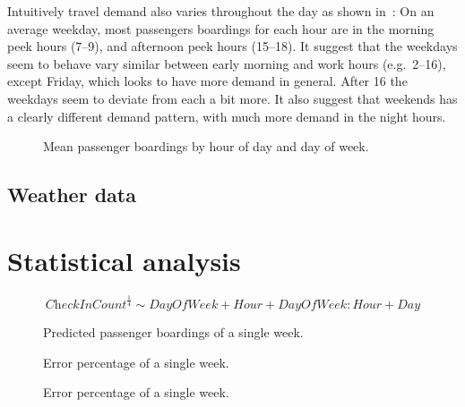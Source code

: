 \documentclass[a4paper,11pt]{article}
\begin{document}
Intuitively travel demand also varies throughout the day as shown in~: On an average weekday, most passengers boardings for each hour are in the morning peek hours (7--9), and afternoon peek hours (15--18). It suggest that the weekdays seem to behave vary similar between early morning and work hours (e.g.\ 2--16), except Friday, which looks to have more demand in general. After 16 the weekdays seem to deviate from each a bit more. It also suggest that weekends has a clearly different demand pattern, with much more demand in the night hours.

\begin{figure}[!ht]
    \center
    
    \caption{Mean passenger boardings by hour of day and day of week.}
    \label{fig:travelcard_hist}
\end{figure}
\clearpage

\subsection{Weather data}\label{ch:desc_weather}

\clearpage

\section{Statistical analysis}

$$
\textit{CheckInCount}^{\frac{1}{4}} \sim \textit{DayOfWeek} + \textit{Hour} + \textit{DayOfWeek}:\textit{Hour} + \textit{Day}
$$

\begin{figure}[!ht]
    \center
    
    \caption{Predicted passenger boardings of a single week.}
    \label{fig:travelcard_pred}
\end{figure}

\clearpage

\begin{figure}[!ht]
    \center
    
    \caption{Error percentage of a single week.}
    \label{fig:travelcard_error_pct}
\end{figure}

\begin{figure}[!ht]
    \center
    
    \caption{Error percentage of a single week.}
    \label{fig:weather_rain}
\end{figure}
\end{document}

